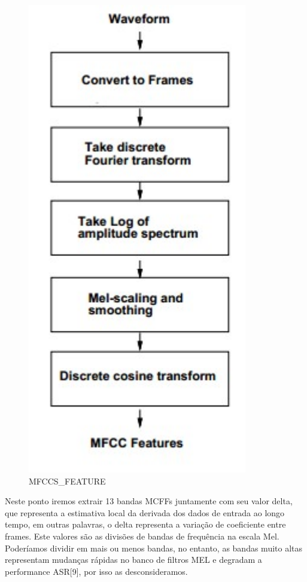 \documentclass[11pt]{article}
\makeatletter
\def\maxwidth{\ifdim\Gin@nat@width>\linewidth\linewidth
    \else\Gin@nat@width\fi}
\let\Oldincludegraphics\includegraphics
\renewcommand{\includegraphics}[1]{\Oldincludegraphics[width=.8\maxwidth]{#1}}
\makeatother
\begin{document}
\begin{figure}[htbp]
\centering
\includegraphics{mfccs.png}
\caption{MFCCS\_FEATURE}
\end{figure}

Neste ponto iremos extrair 13 bandas MCFFs juntamente com seu valor
delta, que representa a estimativa local da derivada dos dados de
entrada ao longo tempo, em outras palavras, o delta representa a
variação de coeficiente entre frames. Este valores são as divisões de
bandas de frequência na escala Mel. Poderíamos dividir em mais ou menos
bandas, no entanto, as bandas muito altas representam mudanças rápidas
no banco de filtros MEL e degradam a performance ASR{[}9{]}, por isso as
desconsideramos.
\end{document}
